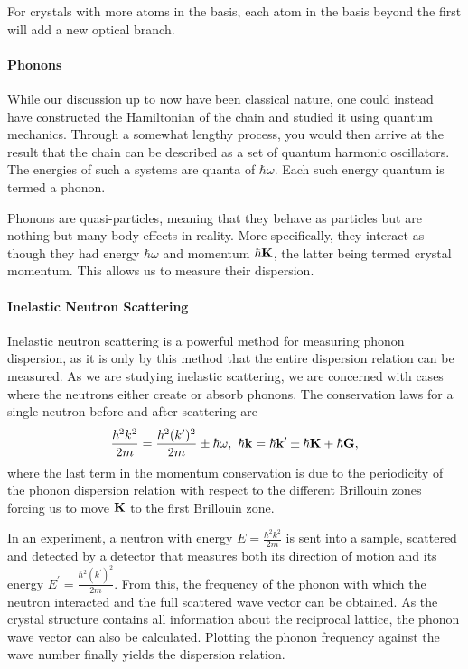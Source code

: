For crystals with more atoms in the basis, each atom in the basis beyond the first will add a new optical branch.


\paragraph{Phonons}
While our discussion up to now have been classical nature, one could instead have constructed the Hamiltonian of the chain and studied it using quantum mechanics. Through a somewhat lengthy process, you would then arrive at the result that the chain can be described as a set of quantum harmonic oscillators. The energies of such a systems are quanta of $\hbar\omega$. Each such energy quantum is termed a phonon.

Phonons are quasi-particles, meaning that they behave as particles but are nothing but many-body effects in reality. More specifically, they interact as though they had energy $\hbar\omega$ and momentum $\hbar\vb{K}$, the latter being termed crystal momentum. This allows us to measure their dispersion.

\paragraph{Inelastic Neutron Scattering}
Inelastic neutron scattering is a powerful method for measuring phonon dispersion, as it is only by this method that the entire dispersion relation can be measured. As we are studying inelastic scattering, we are concerned with cases where the neutrons either create or absorb phonons. The conservation laws for a single neutron before and after scattering are
\begin{align*}
	\frac{\hbar^{2}k^{2}}{2m} = \frac{\hbar^{2}(k^{\prime})^{2}}{2m} \pm \hbar\omega,\ \hbar\vb{k} = \hbar\vb{k}^{\prime} \pm \hbar\vb{K} + \hbar\vb{G},
\end{align*}
where the last term in the momentum conservation is due to the periodicity of the phonon dispersion relation with respect to the different Brillouin zones forcing us to move $\vb{K}$ to the first Brillouin zone.

In an experiment, a neutron with energy $E = \frac{\hbar^{2}k^{2}}{2m}$ is sent into a sample, scattered and detected by a detector that measures both its direction of motion and its energy $E^{\prime} = \frac{\hbar^{2}(k^{\prime})^{2}}{2m}$. From this, the frequency of the phonon with which the neutron interacted and the full scattered wave vector can be obtained. As the crystal structure contains all information about the reciprocal lattice, the phonon wave vector can also be calculated. Plotting the phonon frequency against the wave number finally yields the dispersion relation.


